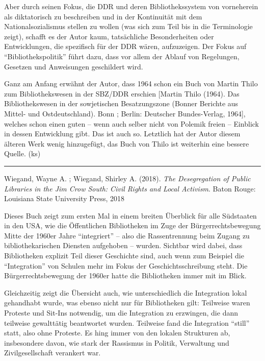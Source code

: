 \documentclass[a4paper,
fontsize=11pt,
oneside,
numbers=noperiodatend,
parskip=half-,
bibliography=totoc,
final
]{scrartcl}
\begin{document}
Aber durch seinen Fokus, die DDR und deren Bibliothekssystem von
vorneherein als diktatorisch zu beschreiben und in der Kontinuität mit
dem Nationalsozialismus stellen zu wollen (was sich zum Teil bis in die
Terminologie zeigt), schafft es der Autor kaum, tatsächliche
Besonderheiten oder Entwicklungen, die spezifisch für der DDR wären,
aufzuzeigen. Der Fokus auf \enquote{Bibliothekspolitik} führt dazu, dass
vor allem der Ablauf von Regelungen, Gesetzen und Anweisungen
geschildert wird.

Ganz am Anfang erwähnt der Autor, dass 1964 schon ein Buch von Martin
Thilo zum Bibliothekswesen in der SBZ/DDR erschien {[}Martin Thilo
(1964). Das Bibliothekswesen in der sowjetischen Besatzungszone (Bonner
Berichte aus Mittel- und Ostdeutschland). Bonn ; Berlin: Deutscher
Bundes-Verlag, 1964{]}, welches schon einen guten -- wenn auch selber
nicht von Polemik freien -- Einblick in dessen Entwicklung gibt. Das ist
auch so. Letztlich hat der Autor diesem älteren Werk wenig hinzugefügt,
das Buch von Thilo ist weiterhin eine bessere Quelle. (ks)

\begin{center}\rule{0.5\linewidth}{0.5pt}\end{center}

Wiegand, Wayne A. ; Wiegand, Shirley A. (2018). \emph{The Desegregation
of Public Libraries in the Jim Crow South: Civil Rights and Local
Activism}. Baton Rouge: Louisiana State University Press, 2018

Dieses Buch zeigt zum ersten Mal in einem breiten Überblick für alle
Südstaaten in den USA, wie die Öffentlichen Bibliotheken im Zuge der
Bürgerrechtsbewegung Mitte der 1960er Jahre \enquote{integriert} -- also
die Rassentrennung beim Zugang zu bibliothekarischen Diensten aufgehoben
-- wurden. Sichtbar wird dabei, dass Bibliotheken explizit Teil dieser
Geschichte sind, auch wenn zum Beispiel die \enquote{Integration} von
Schulen mehr im Fokus der Geschichtsschreibung steht. Die
Bürgerrechtsbewegung der 1960er hatte die Bibliotheken immer mit im
Blick.

Gleichzeitig zeigt die Übersicht auch, wie unterschiedlich die
Integration lokal gehandhabt wurde, was ebenso nicht nur für
Bibliotheken gilt: Teilweise waren Proteste und Sit-Ins notwendig, um
die Integration zu erzwingen, die dann teilweise gewalttätig beantwortet
wurden. Teilweise fand die Integration \enquote{still} statt, also ohne
Proteste. Es hing immer von den lokalen Strukturen ab, insbesondere
davon, wie stark der Rassismus in Politik, Verwaltung und
Zivilgesellschaft verankert war.
\end{document}
